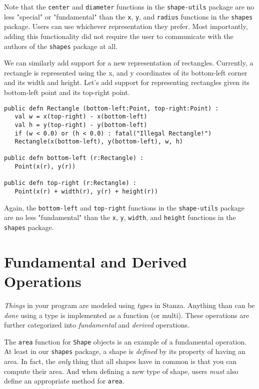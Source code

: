 \documentclass[10pt,oneside]{book}
\begin{document}
Note that the \texttt{\frenchspacing center} and \texttt{\frenchspacing diameter} functions in the \texttt{\frenchspacing shape-utils} package are no less "special" or "fundamental" than the \texttt{\frenchspacing x}, \texttt{\frenchspacing y}, and \texttt{\frenchspacing radius} functions in the \texttt{\frenchspacing shapes} package. Users can use whichever representation they prefer. Most importantly, adding this functionality did not require the user to communicate with the authors of the \texttt{\frenchspacing shapes} package at all. 

We can similarly add support for a new representation of rectangles. Currently, a rectangle is represented using the x, and y coordinates of its bottom-left corner and its width and height. Let's add support for representing rectangles given its bottom-left point and its top-right point.
\begin{lstlisting}
public defn Rectangle (bottom-left:Point, top-right:Point) :
   val w = x(top-right) - x(bottom-left)
   val h = y(top-right) - y(bottom-left)
   if (w < 0.0) or (h < 0.0) : fatal("Illegal Rectangle!")
   Rectangle(x(bottom-left), y(bottom-left), w, h)
   
public defn bottom-left (r:Rectangle) :
   Point(x(r), y(r))

public defn top-right (r:Rectangle) :
   Point(x(r) + width(r), y(r) + height(r))
\end{lstlisting}
Again, the \texttt{\frenchspacing bottom-left} and \texttt{\frenchspacing top-right} functions in the \texttt{\frenchspacing shape-utils} package are no less "fundamental" than the \texttt{\frenchspacing x}, \texttt{\frenchspacing y}, \texttt{\frenchspacing width}, and \texttt{\frenchspacing height} functions in the \texttt{\frenchspacing shapes} package.

\section{Fundamental and Derived Operations}
{\em Things} in your program are modeled using {\em types} in Stanza. Anything than can be {\em done} using a type is implemented as a function (or multi). These operations are further categorized into {\em fundamental} and {\em derived} operations. 

The \texttt{\frenchspacing area} function for \texttt{\frenchspacing Shape} objects is an example of a fundamental operation. At least in our \texttt{\frenchspacing shapes} package, a shape is {\em defined} by its property of having an area. In fact, the {\em only} thing that all shapes have in common is that you can compute their area. And when defining a new type of shape, users {\em must} also define an appropriate method for \texttt{\frenchspacing area}. 
\end{document}
